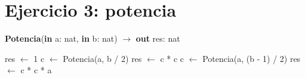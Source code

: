 \section{Ejercicio 3: potencia}

\begin{algorithm}[H]
\caption{
    \textbf{Potencia}(\textbf{in} a: nat, \textbf{in} b: nat) $\to$ \textbf{out} res: nat
}
\begin{algorithmic}[1]
        \State res $\gets$ 1
        \State c $\gets$ Potencia(a, b / 2)
        \State res $\gets$ c * c
    \Else
        \State c $\gets$ Potencia(a, (b - 1) / 2)
        \State res $\gets$ c * c * a
    \EndIf
\end{algorithmic}
\end{algorithm}

